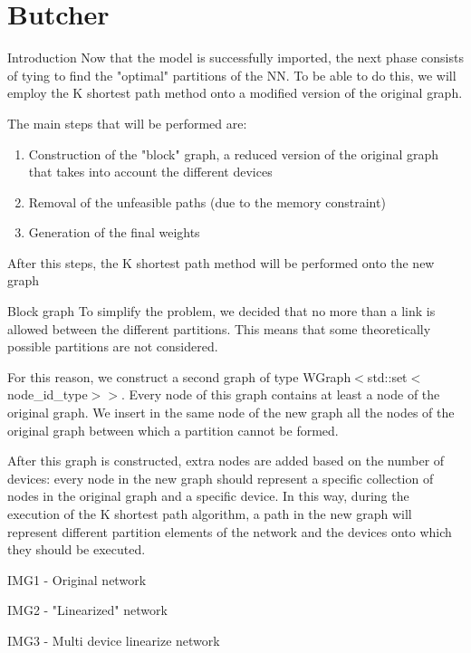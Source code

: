 \section{Butcher}

\begin{frame}[plain]{}
    \sectionpage
\end{frame}

\begin{frame}{Introduction}
    Now that the model is successfully imported, the next phase consists of tying to find the "optimal" partitions of the NN. To be able to do this, we will employ the K shortest path method onto a modified version of the original graph.
    
    The main steps that will be performed are:
    \begin{enumerate}
        \item Construction of the "block" graph, a reduced version of the original graph that takes into account the different devices
        \item Removal of the unfeasible paths (due to the memory constraint)
        \item Generation of the final weights
    \end{enumerate}
    
    After this steps, the K shortest path method will be performed onto the new graph
\end{frame}

\begin{frame}[allowframebreaks]{Block graph}
    To simplify the problem, we decided that no more than a link is allowed between the different partitions. This means that some theoretically possible partitions are not considered. 
    
    For this reason, we construct a second graph of type WGraph$<$std::set$<$node\_id\_type$>>$. Every node of this graph contains at least a node of the original graph. We insert in the same node of the new graph all the nodes of the original graph between which a partition cannot be formed.
    
    \framebreak
    
    After this graph is constructed, extra nodes are added based on the number of devices: every node in the new graph should represent a specific collection of nodes in the original graph and a specific device. In this way, during the execution of the K shortest path algorithm, a path in the new graph will represent different partition elements of the network and the devices onto which they should be executed.
    
    IMG1 - Original network
    
    IMG2 - "Linearized" network
    
    IMG3 - Multi device linearize network
\end{frame}


